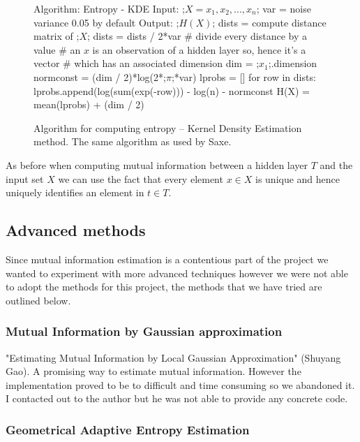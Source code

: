 \begin{figure}[H]
    \begin{pythonfigure}
      Algorithm: Entropy - KDE
      Input: 
      ;$X = x_1, x_2,...,x_n$;  
      var = noise variance 0.05 by default
      Output: ;$H(X)$;
      dists = compute distance matrix of ;$X$;
      dists = dists / 2*var # divide every distance by a value
      # an $x$ is an observation of a hidden layer so, hence it's a vector 
      # which has an associated dimension
      dim = ;$x_1$;.dimension
      normconst = (dim / 2)*log(2*;$\pi$;*var)
      lprobs = []
      for row in dists:
        lprobs.append(log(sum(exp(-row))) - log(n) - normconst
      H(X) = mean(lprobs) + (dim / 2)
    \end{pythonfigure}
    \caption{Algorithm for computing entropy -- Kernel Density Estimation method.
    The same algorithm as used by Saxe.}
    \label{fig:entropy3}
\end{figure} 

As before when computing mutual information between a hidden layer $T$ and the
input set $X$ we can use the fact that every element $x\in X$ is unique and
hence uniquely identifies an element in $t\in T$.

\subsection{Advanced methods} \label{ssection:advanced}

Since mutual information estimation is a contentious part of the project we
wanted to experiment with more advanced techniques however we were not able to
adopt the methods for this project, the methods that we have tried are outlined
below.

\subsubsection{Mutual Information by Gaussian approximation}
  
  "Estimating Mutual Information by Local Gaussian Approximation" (Shuyang Gao). A
  promising way to estimate mutual information. However the implementation
  proved to be to difficult and time consuming so we abandoned it. I contacted
  out to the author but he was not able to provide any concrete code.

\subsubsection{Geometrical Adaptive Entropy Estimation}

